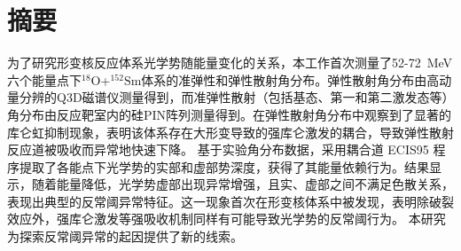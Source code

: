 \maketitle%
\chapter*{摘\quad 要}%
\setcounter{page}{1}%

    为了研究形变核反应体系光学势随能量变化的关系，本工作首次测量了52-72~MeV六个能量点下$^{18}\mathrm{O}$+$^{152}\mathrm{Sm}$体系的准弹性和弹性散射角分布。弹性散射角分布由高动量分辨的Q3D磁谱仪测量得到，而准弹性散射（包括基态、第一和第二激发态等）角分布由反应靶室内的硅PIN阵列测量得到。在弹性散射角分布中观察到了显著的库仑虹抑制现象，表明该体系存在大形变导致的强库仑激发的耦合，导致弹性散射反应道被吸收而异常地快速下降。
    基于实验角分布数据，采用耦合道 ECIS95 程序提取了各能点下光学势的实部和虚部势深度，获得了其能量依赖行为。结果显示，随着能量降低，光学势虚部出现异常增强，且实、虚部之间不满足色散关系，表现出典型的反常阈异常特征。这一现象首次在形变核体系中被发现，表明除破裂效应外，强库仑激发等强吸收机制同样有可能导致光学势的反常阈行为。
    本研究为探索反常阈异常的起因提供了新的线索。

